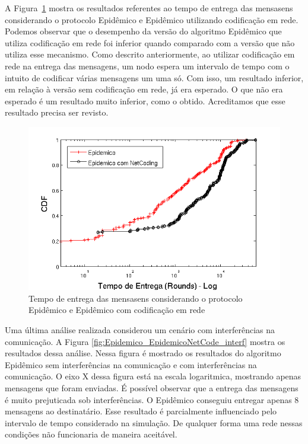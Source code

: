 
A Figura~\ref{fig:Epidemico_EpidemicoNetCode} mostra os resultados
referentes ao tempo de entrega das mensasens considerando o protocolo
Epidêmico e Epidêmico utilizando codificação em rede. Podemos observar
que o desempenho da versão do algoritmo Epidêmico que utiliza
codificação em rede foi inferior quando comparado com a versão que não
utiliza esse mecanismo. Como descrito anteriormente, ao utilizar
codificação em rede na entrega das mensagens, um nodo espera um
intervalo de tempo com o intuito de codificar várias mensagens um uma
só. Com isso, um resultado inferior, em relação à versão sem codificação
em rede, já era esperado. O que não era esperado é um resultado muito
inferior, como o obtido. Acreditamos que esse resultado precisa ser
revisto.

\begin{figure}[ht]
\centering
\includegraphics[width=.7\textwidth]{img/tempo_epidemico_EpidemNetCode.png}
\caption{Tempo de entrega das mensasens considerando o protocolo Epidêmico e Epidêmico com codificação em rede}
\label{fig:Epidemico_EpidemicoNetCode}
\end{figure}

Uma última análise realizada considerou um cenário com interferências na
comunicação. A Figura \ref{fig:Epidemico_EpidemicoNetCode_interf} mostra
os resultados dessa análise. Nessa figura é mostrado os resultados do
algoritmo Epidêmico sem interferências na comunicação e com
interferências na comunicação.  O eixo X dessa figura está na escala
logaritmica, mostrando apenas mensagens que foram enviadas.  É possível
observar que a entrega das mensagens é muito prejuticada sob
interferências. O Epidêmico conseguiu entregar apenas 8 mensagens ao
destinatário. Esse resultado é parcialmente influenciado pelo intervalo
de tempo considerado na simulação. De qualquer forma uma rede nessas
condições não funcionaria de maneira aceitável.

